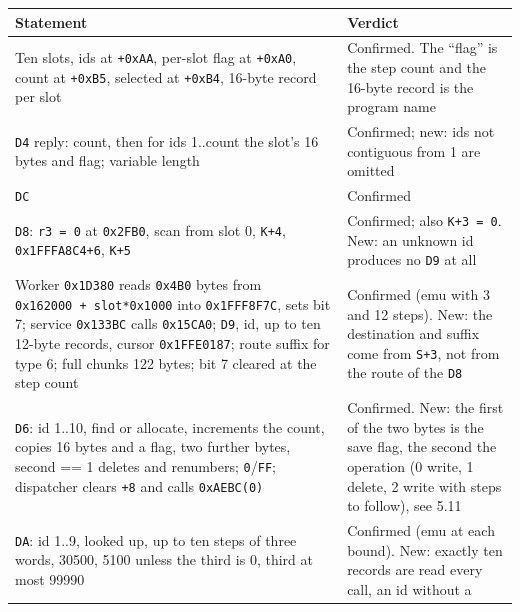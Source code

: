 {\def\LTcaptype{none} %
\begin{longtable}[]{@{}
  >{\raggedright\arraybackslash}p{}
  >{\raggedright\arraybackslash}p{}@{}}
\toprule\noalign{}
\begin{minipage}[b]{\linewidth}\raggedright
Statement
\end{minipage} & \begin{minipage}[b]{\linewidth}\raggedright
Verdict
\end{minipage} \\
\midrule\noalign{}
\endhead
\bottomrule\noalign{}
\endlastfoot
Ten slots, ids at \texttt{+0xAA}, per-slot flag at \texttt{+0xA0}, count
at \texttt{+0xB5}, selected at \texttt{+0xB4}, 16-byte record per slot &
Confirmed. The ``flag'' is the step count and the 16-byte record is the
program name \\
\texttt{D4} reply: count, then for ids 1..count the slot's 16 bytes and
flag; variable length & Confirmed; new: ids not contiguous from 1 are
omitted \\
\texttt{DC} & Confirmed \\
\texttt{D8}: \texttt{r3\ =\ 0} at \texttt{0x2FB0}, scan from slot 0,
\texttt{K+4}, \texttt{0x1FFFA8C4+6}, \texttt{K+5} & Confirmed; also
\texttt{K+3\ =\ 0}. New: an unknown id produces no \texttt{D9} at all \\
Worker \texttt{0x1D380} reads \texttt{0x4B0} bytes from
\texttt{0x162000\ +\ slot*0x1000} into \texttt{0x1FFF8F7C}, sets bit 7;
service \texttt{0x133BC} calls \texttt{0x15CA0}; \texttt{D9}, id, up to
ten 12-byte records, cursor \texttt{0x1FFE0187}; route suffix for type
6; full chunks 122 bytes; bit 7 cleared at the step count & Confirmed
(emu with 3 and 12 steps). New: the destination and suffix come from
\texttt{S+3}, not from the route of the \texttt{D8} \\
\texttt{D6}: id 1..10, find or allocate, increments the count, copies 16
bytes and a flag, two further bytes, second == 1 deletes and renumbers;
\texttt{0}/\texttt{FF}; dispatcher clears \texttt{+8} and calls
\texttt{0xAEBC(0)} & Confirmed. New: the first of the two bytes is the
save flag, the second the operation (0 write, 1 delete, 2 write with
steps to follow), see 5.11 \\
\texttt{DA}: id 1..9, looked up, up to ten steps of three words, 30500,
5100 unless the third is 0, third at most 99990 & Confirmed (emu at each
bound). New: exactly ten records are read every call, an id without a

\end{longtable}}

